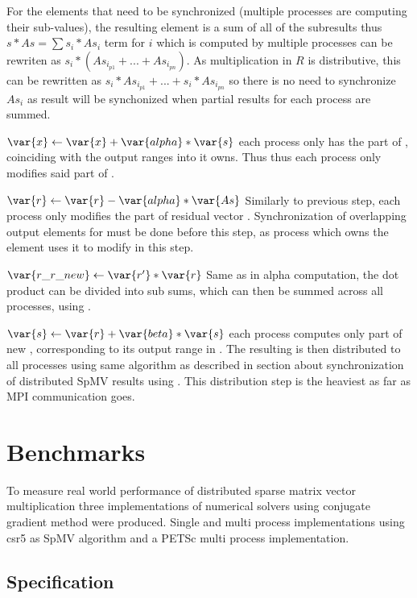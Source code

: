 \documentclass[thesis=M,english]{FITthesis}[2019/12/23]
\begin{document}
For the elements that need to be synchronized (multiple processes are computing their sub-values),
the resulting element is a sum of all of the subresults thus $s * As = \sum s_i * As_i$ term for $i$
which is computed by multiple processes can be rewriten as $s_i * (As_{i_{p1}} + ... + As_{i_{pn}})$.
As multiplication in $R$ is distributive, this can be rewritten as $s_i * As_{i_{p1}} + ... + s_i * As_{i_{pn}}$
so there is no need to synchronize $As_i$ as result will be synchonized when partial results for
each process are summed.

$\var{x} \gets \var{x} + \var{alpha} * \var{s}$ each process only has the part of ,
coinciding with the output ranges into  it owns. Thus thus each process only
modifies said part of .

$\var{r} \gets \var{r} - \var{alpha} * \var{As}$ Similarly to previous step, each process
only modifies the part of residual vector . Synchronization of overlapping
output elements for  must be done before this step, as process which owns the
element uses it to modify  in this step.

$\var{r\_r\_new} \gets \var{r'} * \var{r}$ Same as in alpha computation, the dot product
can be divided into sub sums, which can then be summed across all processes, using
.

$\var{s} \gets \var{r} + \var{beta} * \var{s}$ each process computes only part of new
, corresponding to its output range in . The resulting  is
then distributed to all processes using same algorithm as described in section
about synchronization of distributed SpMV results using .
This distribution step is the heaviest as far as MPI communication goes.


\chapter{Benchmarks}

To measure real world performance of distributed sparse matrix vector multiplication
three implementations of numerical solvers using conjugate gradient method were produced.
Single and multi process implementations using csr5 as SpMV algorithm and a PETSc
multi process implementation.

\section{Specification}
\end{document}
